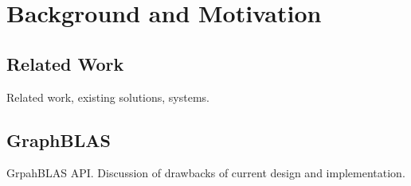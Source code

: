 \section{Background and Motivation}

\subsection{Related Work}
Related work, existing solutions, systems.  

\subsection{GraphBLAS}
GrpahBLAS API.
Discussion of drawbacks of current design and implementation.
